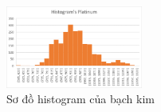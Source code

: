 \begin{figure}[htbp]
\centerline{\includegraphics[width=0.4\textwidth]{img/Picture7.png}}
\caption{Sơ đồ histogram của bạch kim}
\label{fit}
\end{figure}